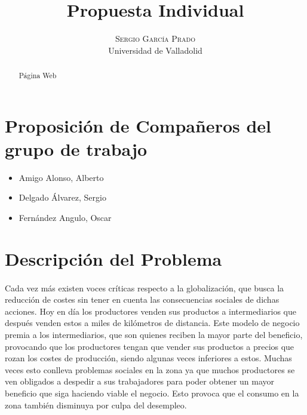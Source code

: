 \documentclass[10pt, a4paper,spanish]{article}
\title{\vspace{-15mm}\fontsize{24pt}{10pt}\selectfont\textbf{Propuesta Individual}} %
\author{
\large
\textsc{Sergio García Prado}\\[2mm] %
\normalsize Universidad de Valladolid \\ %
\vspace{-5mm}
}
\date{}
\begin{document}
	\maketitle %

	\thispagestyle{fancy} %


	\begin{abstract}
		\noindent Página Web 
	\end{abstract}

		\section{Proposición de Compañeros del grupo de trabajo}
			
			\begin{center}
				\begin{varwidth}{\textwidth}
					\begin{itemize}
						\item Amigo Alonso, Alberto
						\item Delgado Álvarez, Sergio
						\item Fernández Angulo, Oscar
					\end{itemize}
				\end{varwidth}
			\end{center}
			
		\section{Descripción del Problema}
		
			\paragraph{}
			Cada vez más existen voces críticas respecto a la globalización, que busca la reducción de costes sin tener en cuenta las consecuencias sociales de dichas acciones. Hoy en día los productores venden sus productos a intermediarios que después venden estos a miles de kilómetros de distancia. Este modelo de negocio premia a los intermediarios, que son quienes reciben la mayor parte del beneficio, provocando que los productores tengan que vender sus productos a precios que rozan los costes de producción, siendo algunas veces inferiores a estos. Muchas veces esto conlleva problemas sociales en la zona ya que muchos productores se ven obligados a despedir a sus trabajadores para poder obtener un mayor beneficio que siga haciendo viable el negocio. Esto provoca que el consumo en la zona también disminuya por culpa del desempleo.
			
\end{document}
